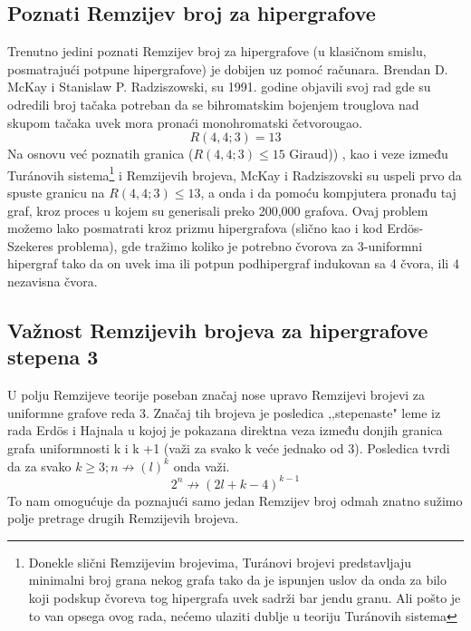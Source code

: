 \documentclass[a4paper]{article}
\begin{document}
	\subsection{Poznati Remzijev broj za hipergrafove}%
	Trenutno jedini poznati Remzijev broj za hipergrafove (u klasičnom smislu, posmatrajući potpune hipergrafove)\cite{pregled}%
	 je dobijen uz pomoć računara. Brendan D. McKay i Stanislaw P. Radziszowski, su 1991. godine objavili svoj rad \textcite{HGremzibroj} gde su odredili broj tačaka potreban da se bihromatskim bojenjem trouglova nad skupom tačaka uvek mora pronaći monohromatski četvorougao.%
	\begin{equation}
		R(4, 4; 3) = 13
	\end{equation}
	Na osnovu već poznatih granica ($R(4, 4; 3) \leq 15$ Giraud))%
	, kao i veze između Tur\'{a}novih sistema\footnote{Donekle slični Remzijevim brojevima, Tur\'{a}novi brojevi predstavljaju minimalni broj grana nekog grafa tako da je ispunjen uslov da onda za bilo koji podskup čvoreva tog hipergrafa uvek sadrži bar jendu granu. Ali pošto je to van opsega ovog rada, nećemo ulaziti dublje u teoriju Tur\'{a}novih sistema } i Remzijevih brojeva, McKay i Radziszovski su uspeli prvo da spuste granicu na $R(4, 4; 3) \leq 13$, a onda i da pomoću kompjutera pronađu taj graf, kroz proces u kojem su generisali preko 200,000 grafova. Ovaj problem možemo lako posmatrati kroz prizmu hipergrafova (slično kao i kod Erd\"{o}s-Szekeres problema), gde tražimo koliko je potrebno čvorova za 3-uniformni hipergraf tako da on uvek ima ili potpun podhipergraf indukovan sa 4 čvora, ili 4  nezavisna čvora. %
	\subsection{Važnost Remzijevih brojeva za hipergrafove stepena 3}
	U polju Remzijeve teorije poseban značaj nose upravo Remzijevi brojevi za uniformne grafove reda 3. Značaj tih brojeva je posledica ‚‚stepenaste" leme iz rada Erd\"{o}s i Hajnala \cite{posledice3remzi} %
	 u kojoj je pokazana direktna veza između donjih granica grafa uniformnosti k i k +1 (važi za svako k veće jednako od 3). Posledica tvrdi da za svako $k \geq 3; n \not\rightarrow (l)^k$ onda važi. \cite{matoraknjigajedvanadjena}
	\begin{equation}
		2^n \not\rightarrow (2l + k - 4)^{k-1}
	\end{equation}
	To nam omogućuje da poznajući samo jedan Remzijev broj odmah znatno sužimo polje pretrage drugih Remzijevih brojeva.
\end{document}
